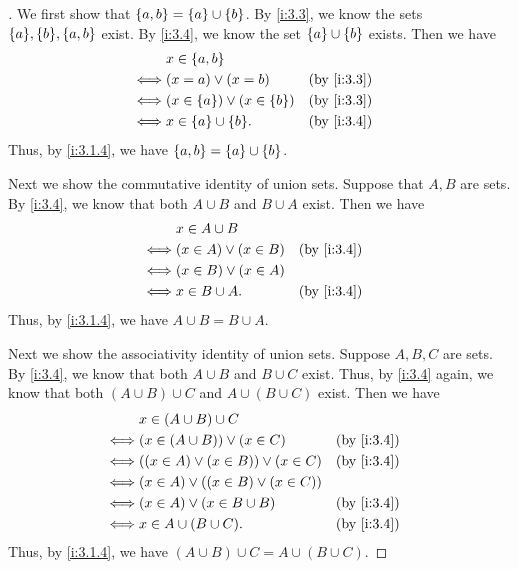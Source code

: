 \begin{proof}[]
  We first show that \(\left\lbrace a, b\right\rbrace = \left\lbrace a\right\rbrace \cup \left\lbrace b\right\rbrace\).
  By \cref{i:3.3}, we know the sets \(\set{a}, \set{b}, \set{a, b}\) exist.
  By \cref{i:3.4}, we know the set \(\left\lbrace a\right\rbrace \cup \left\lbrace b\right\rbrace\) exists.
  Then we have
  \begin{align*}
         & x \in \set{a, b}                                     \\
    \iff & (x = a) \lor (x = b)                 &  & \by{i:3.3} \\
    \iff & (x \in \set{a}) \lor (x \in \set{b}) &  & \by{i:3.3} \\
    \iff & x \in \set{a} \cup \set{b}.          &  & \by{i:3.4}
  \end{align*}
  Thus, by \cref{i:3.1.4}, we have \(\left\lbrace a, b\right\rbrace = \left\lbrace a\right\rbrace \cup \left\lbrace b\right\rbrace\).

  Next we show the commutative identity of union sets.
  Suppose that \(A, B\) are sets.
  By \cref{i:3.4}, we know that both \(A \cup B\) and \(B \cup A\) exist.
  Then we have
  \begin{align*}
         & x \in A \cup B                           \\
    \iff & (x \in A) \lor (x \in B) &  & \by{i:3.4} \\
    \iff & (x \in B) \lor (x \in A)                 \\
    \iff & x \in B \cup A.          &  & \by{i:3.4}
  \end{align*}
  Thus, by \cref{i:3.1.4}, we have \(A \cup B = B \cup A\).

  Next we show the associativity identity of union sets.
  Suppose \(A, B, C\) are sets.
  By \cref{i:3.4}, we know that both \(A \cup B\) and \(B \cup C\) exist.
  Thus, by \cref{i:3.4} again, we know that both \((A \cup B) \cup C\) and \(A \cup (B \cup C)\) exist.
  Then we have
  \begin{align*}
         & x \in (A \cup B) \cup C                                   \\
    \iff & (x \in (A \cup B)) \lor (x \in C)         &  & \by{i:3.4} \\
    \iff & ((x \in A) \lor (x \in B)) \lor (x \in C) &  & \by{i:3.4} \\
    \iff & (x \in A) \lor ((x \in B) \lor (x \in C))                 \\
    \iff & (x \in A) \lor (x \in B \cup B)           &  & \by{i:3.4} \\
    \iff & x \in A \cup (B \cup C).                  &  & \by{i:3.4}
  \end{align*}
  Thus, by \cref{i:3.1.4}, we have \((A \cup B) \cup C = A \cup (B \cup C)\).


\end{proof}

